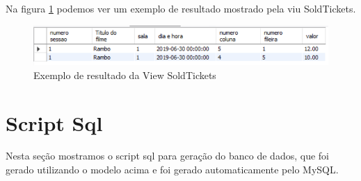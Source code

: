 \documentclass[a4paper,10pt]{article}
\begin{document}
Na figura \ref{fig:view_soldticket} podemos ver um exemplo de resultado mostrado pela viu SoldTickets.

\begin{figure}%
\includegraphics[width=\columnwidth]{View_exemplo}%
\caption{Exemplo de resultado da View SoldTickets}%
\label{fig:view_soldticket}%
\end{figure}

\section{Script Sql}

Nesta seção mostramos o script sql para geração do banco de dados, que foi gerado utilizando o modelo acima e foi gerado automaticamente pelo MySQL.
\end{document}
